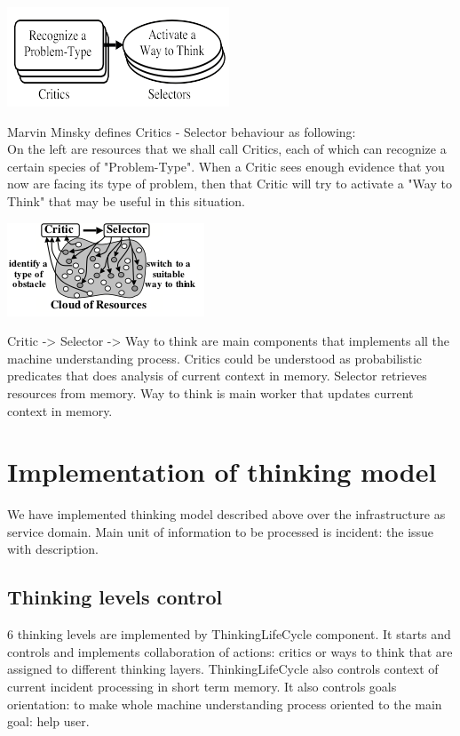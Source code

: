\documentclass{acm_proc_article-sp}
\begin{document}
\includegraphics{critic_selector_model.png}


Marvin Minsky defines Critics - Selector behaviour as following:\\
On the left are resources that we shall call Critics, each of which can recognize a certain species of "Problem-Type". When a Critic sees enough evidence that you now are facing its type of problem, then that Critic will try to activate a "Way to Think" that may be useful in this situation.

\includegraphics{critic_selector.png}

Critic -> Selector -> Way to think are main components that implements all the machine understanding process. Critics could be understood as probabilistic predicates that does analysis of current context in memory. Selector retrieves resources from memory. Way to think is main worker that updates current context in memory.

\section{Implementation of thinking model}

We have implemented thinking model described above over the infrastructure as service domain. Main unit of information to be processed is incident: the issue with description.

\subsection{Thinking levels control}

6 thinking levels are implemented by ThinkingLifeCycle component. It starts and controls and implements collaboration of actions: critics or ways to think that are assigned to different thinking layers. ThinkingLifeCycle also controls context of current incident processing in short term memory. It also controls goals orientation: to make whole machine understanding process oriented to the main goal: help user.\\
\end{document}
